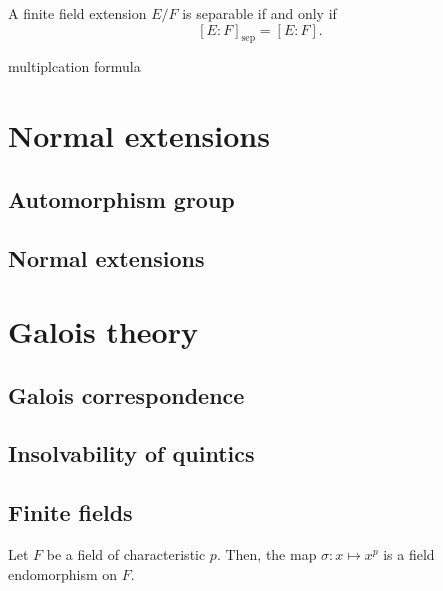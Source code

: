\documentclass{../exp}
\newcommand{\sep}{\mathrm{sep}}
\begin{document}
\begin{thm}
A finite field extension $E/F$ is separable if and only if
\[[E:F]_\sep=[E:F].\]
\end{thm}
\begin{pf}
\end{pf}


multiplcation formula












\section{Normal extensions}
\subsection{Automorphism group}

\subsection{Normal extensions}









\section{Galois theory}
\subsection{Galois correspondence}


\subsection{Insolvability of quintics}


\subsection{Finite fields}
\begin{lem}
Let $F$ be a field of characteristic $p$.
Then, the map $\sigma:x\mapsto x^p$ is a field endomorphism on $F$.
\end{lem}
\end{document}
